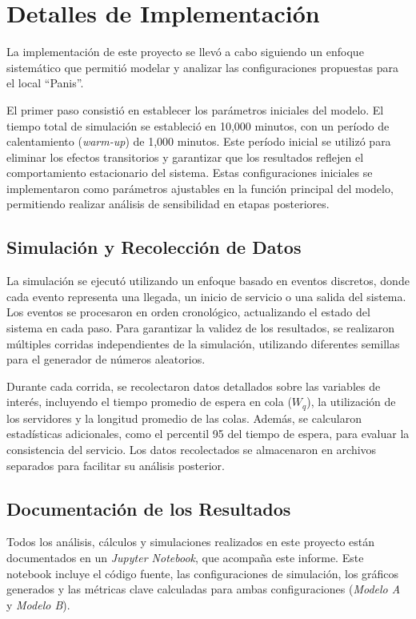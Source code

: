 \documentclass[a4paper,12pt]{article}
\begin{document}
\section{Detalles de Implementación}

La implementación de este proyecto se llevó a cabo siguiendo un enfoque sistemático que permitió modelar y analizar las configuraciones propuestas para el local “Panis”.

El primer paso consistió en establecer los parámetros iniciales del modelo. 
El tiempo total de simulación se estableció en 10,000 minutos, con un período de calentamiento (\textit{warm-up}) de 1,000 minutos. Este período inicial se utilizó para eliminar los efectos transitorios y garantizar que los resultados reflejen el comportamiento estacionario del sistema. Estas configuraciones iniciales se implementaron como parámetros ajustables en la función principal del modelo, permitiendo realizar análisis de sensibilidad en etapas posteriores.

\subsection{Simulación y Recolección de Datos}

La simulación se ejecutó utilizando un enfoque basado en eventos discretos, donde cada evento representa una llegada, un inicio de servicio o una salida del sistema. Los eventos se procesaron en orden cronológico, actualizando el estado del sistema en cada paso. Para garantizar la validez de los resultados, se realizaron múltiples corridas independientes de la simulación, utilizando diferentes semillas para el generador de números aleatorios.

Durante cada corrida, se recolectaron datos detallados sobre las variables de interés, incluyendo el tiempo promedio de espera en cola ($W_q$), la utilización de los servidores y la longitud promedio de las colas. Además, se calcularon estadísticas adicionales, como el percentil 95 del tiempo de espera, para evaluar la consistencia del servicio. Los datos recolectados se almacenaron en archivos separados para facilitar su análisis posterior.

\subsection{Documentación de los Resultados}

Todos los análisis, cálculos y simulaciones realizados en este proyecto están documentados en un \textit{Jupyter Notebook}, que acompaña este informe. Este notebook incluye el código fuente, las configuraciones de simulación, los gráficos generados y las métricas clave calculadas para ambas configuraciones (\textit{Modelo A} y \textit{Modelo B}).
\end{document}
